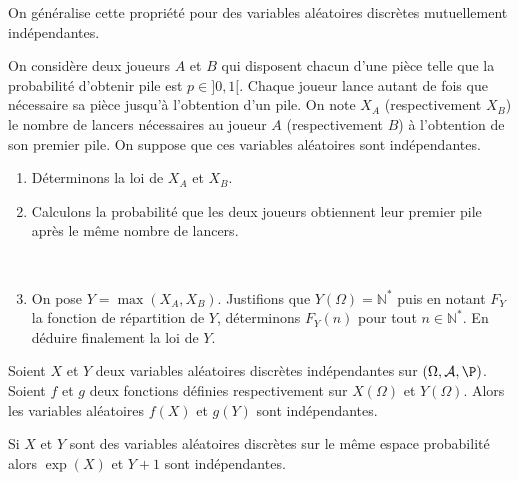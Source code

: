 \documentclass[a4paper,10pt]{report}
\begin{document}
\begin{rem} On généralise cette propriété pour des variables aléatoires discrètes mutuellement indépendantes.
\end{rem}

\begin{ex} On considère deux joueurs $A$ et $B$ qui disposent chacun d'une pièce telle que la probabilité d'obtenir pile est $p \in ]0,1[$. Chaque joueur lance autant de fois que nécessaire sa pièce jusqu'à l'obtention d'un pile. On note $X_A$ (respectivement $X_B$) le nombre de lancers nécessaires au joueur $A$ (respectivement $B$) à l'obtention de son premier pile. On suppose que ces variables aléatoires sont indépendantes. 
\begin{enumerate}
\item Déterminons la loi de $X_A$ et $X_B$. 

\vspace{3cm}
\item Calculons la probabilité que les deux joueurs obtiennent leur premier pile après le même nombre de lancers.

\vspace{6cm}

\newpage

$\phantom{}$

\vspace{3cm}
\item On pose $Y=\max (X_A,X_B)$. Justifions que $Y(\Omega) = \mathbb{N}^*$ puis en notant $F_Y$ la fonction de répartition de $Y$, déterminons $F_Y(n)$ pour tout $n \in \mathbb{N}^*$. En déduire finalement la loi de $Y$.

\vspace{8cm}
\end{enumerate}
\end{ex}


\begin{cor} Soient $X$ et $Y$ deux variables aléatoires discrètes indépendantes sur $(\Omega, \mathcal{A}, \P)$.  Soient $f$ et $g$ deux fonctions définies respectivement sur $X(\Omega)$ et $Y(\Omega)$. Alors les variables aléatoires $f(X)$ et $g(Y)$ sont indépendantes.
\end{cor}

\begin{preuve}

\vspace{3cm}
\end{preuve}

\begin{ex} Si $X$ et $Y$ sont des variables aléatoires discrètes sur le même espace probabilité alors $\exp(X)$ et $Y+1$ sont indépendantes.
\end{ex}
\end{document}
